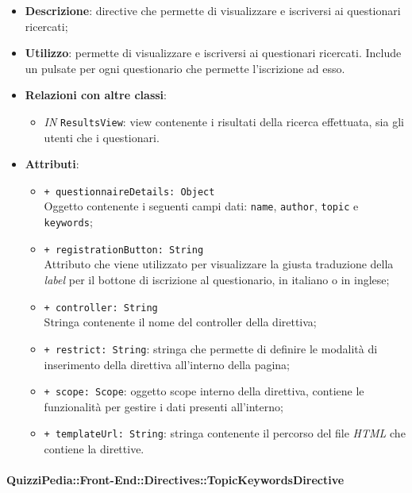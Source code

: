 \begin{itemize}
	\item \textbf{Descrizione}: directive che permette di visualizzare e iscriversi ai questionari ricercati;
	\item \textbf{Utilizzo}: permette di visualizzare e iscriversi ai questionari ricercati. Include un pulsate per ogni questionario che permette l'iscrizione ad esso.
	\item \textbf{Relazioni con altre classi}:
	\begin{itemize}
		\item \textit{IN} \texttt{ResultsView}: view contenente i risultati della ricerca effettuata, sia gli utenti che i questionari.
	\end{itemize}
	\item \textbf{Attributi}:
	\begin{itemize}
		\item \texttt{+ questionnaireDetails: Object} \\ Oggetto contenente i seguenti campi dati: \texttt{name}, \texttt{author}, \texttt{topic} e \texttt{keywords};
		\item \texttt{+ registrationButton: String} \\ Attributo che viene utilizzato per visualizzare la giusta traduzione della \textit{label} per il bottone di iscrizione al questionario, in italiano o in inglese;
		\item \texttt{+ controller: String} \\ Stringa contenente il nome del controller della direttiva;
		\item \texttt{+ restrict: String}: stringa che permette di definire le modalità di inserimento della direttiva all'interno della pagina;
		\item \texttt{+ scope: Scope}: oggetto scope interno della direttiva, contiene le funzionalità per gestire i dati presenti all'interno;
		\item \texttt{+ templateUrl: String}: stringa contenente il percorso del file \textit{HTML} che contiene la direttive.
	\end{itemize}
\end{itemize}

\paragraph{QuizziPedia::Front-End::Directives::TopicKeywordsDirective}

\label{QuizziPedia::Front-End::Directives::TopicKeywordsDirective}

